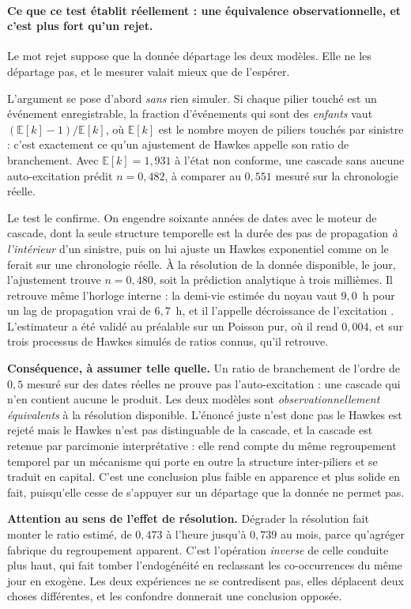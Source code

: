\paragraph{Ce que ce test établit réellement : une équivalence observationnelle, et c'est plus
fort qu'un rejet.} Le mot \og rejet \fg{} suppose que la donnée départage les deux modèles. Elle
ne les départage pas, et le mesurer valait mieux que de l'espérer.

L'argument se pose d'abord \emph{sans} rien simuler. Si chaque pilier touché est un événement
enregistrable, la fraction d'événements qui sont des \emph{enfants} vaut
$(\mathbb{E}[k]-1)/\mathbb{E}[k]$, où $\mathbb{E}[k]$ est le nombre moyen de piliers touchés par
sinistre : c'est exactement ce qu'un ajustement de Hawkes appelle son ratio de branchement. Avec
$\mathbb{E}[k]=1{,}931$ à l'état non conforme, une cascade sans aucune auto-excitation
prédit $n=0{,}482$, à comparer au $0{,}551$ mesuré sur la chronologie réelle.

Le test le confirme. On engendre soixante années de dates avec le moteur de cascade, dont la
seule structure temporelle est la durée des pas de propagation \emph{à l'intérieur} d'un sinistre,
puis on lui ajuste un Hawkes exponentiel comme on le ferait sur une chronologie réelle. À la
résolution de la donnée disponible, le jour, l'ajustement trouve $n=0{,}480$, soit la prédiction
analytique à trois millièmes. Il retrouve même l'horloge interne : la demi-vie estimée du noyau
vaut $9{,}0$~h pour un lag de propagation vrai de $6{,}7$~h, et il l'appelle \og décroissance de
l'excitation \fg{}. L'estimateur a été validé au préalable sur un Poisson pur, où il rend
$0{,}004$, et sur trois processus de Hawkes simulés de ratios connus, qu'il retrouve.

\begin{cle}
\textbf{Conséquence, à assumer telle quelle.} Un ratio de branchement de l'ordre de $0{,}5$
mesuré sur des dates réelles ne prouve pas l'auto-excitation : une cascade qui n'en
contient aucune le produit. Les deux modèles sont \emph{observationnellement équivalents} à la
résolution disponible. L'énoncé juste n'est donc pas \og le Hawkes est rejeté \fg{} mais \og le
Hawkes n'est pas distinguable de la cascade, et la cascade est retenue par parcimonie
interprétative \fg{} : elle rend compte du même regroupement temporel par un mécanisme qui porte
en outre la structure inter-piliers et se traduit en capital. C'est une conclusion plus faible en
apparence et plus solide en fait, puisqu'elle cesse de s'appuyer sur un départage que la donnée
ne permet pas.

\textbf{Attention au sens de l'effet de résolution.} Dégrader la résolution fait monter
le ratio estimé, de $0{,}473$ à l'heure jusqu'à $0{,}739$ au mois, parce qu'agréger fabrique du
regroupement apparent. C'est l'opération \emph{inverse} de celle conduite plus haut, qui fait
tomber l'endogénéité en reclassant les co-occurrences du même jour en exogène. Les deux
expériences ne se contredisent pas, elles déplacent deux choses différentes, et les confondre
donnerait une conclusion opposée.
\end{cle}

